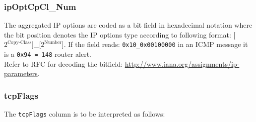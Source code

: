 \documentclass[documentation]{subfiles}
\begin{document}
\subsubsection{ipOptCpCl\_Num}\label{ipOptCpClNum}%
The aggregated IP options are coded as a bit field in hexadecimal notation where the bit position denotes the IP options type according to following format: [$2^{\text{Copy-Class}}$]\_[$2^{\text{Number}}$]. If the field reads: {\tt 0x10\_0x00100000} in an ICMP message it is a {\tt 0x94 = 148} router alert. \\
Refer to RFC for decoding the bitfield: \url{http://www.iana.org/assignments/ip-parameters}.

\subsubsection{tcpFlags}\label{tcpFlags}
The {\tt tcpFlags} column is to be interpreted as follows:
\end{document}
